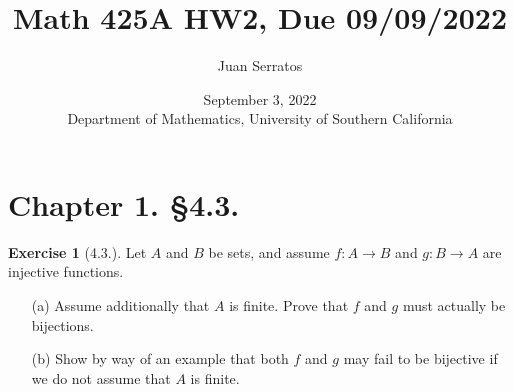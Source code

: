 \documentclass[9pt,reqno]{amsart}
\title{Math 425A HW2, Due 09/09/2022}
\author{Juan Serratos}
\date{ September 3, 2022 \\ {Department of Mathematics, University of Southern California}}
\theoremstyle{definition}
\newtheorem{exercise}{Exercise}[section]
\begin{document}
\maketitle
\setcounter{tocdepth}{4}
\setcounter{secnumdepth}{4}

\section*{Chapter 1. \S 4.3.}
\begin{exercise}[4.3.] Let $A$ and $B$ be sets, and assume $f \colon A \to B$ and $g \colon B \to A$ are injective functions.
\begin{itemize}
	\item [(a)] Assume additionally that $A$ is finite. Prove that $f$ and $g$ must actually be bijections.
	\item [(b)] Show by way of an example that both $f$ and $g$ may fail to be bijective if we do not assume that $A$ is finite.
\end{itemize}
\end{exercise}
\end{document}
